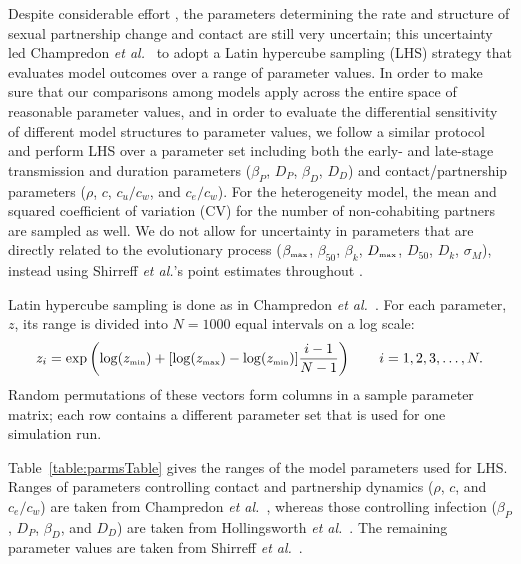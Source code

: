 \documentclass[10pt,letterpaper]{article}
\newcommand{\etal}{\textit{et al.}}
\newcommand{\tsub}[2]{#1_{{\textrm{\tiny #2}}}}
\begin{document}
Despite considerable effort \cite{hollingsworth_hiv1_2008,champredon_hiv_2013}, the parameters determining the rate and structure of sexual partnership change and contact are still very uncertain; this uncertainty led Champredon \etal\ \cite{champredon_hiv_2013} to adopt a Latin hypercube sampling (LHS) strategy \cite{blower_drugs_1991} that evaluates model outcomes over a range of parameter values. In order to make sure that our comparisons among models apply across the entire space of reasonable parameter values, and in order to evaluate the differential sensitivity of different model structures to parameter values, we follow a similar protocol and perform LHS over a parameter set including both the early- and late-stage transmission and duration parameters ($\beta_P$, $D_P$, $\beta_D$, $D_D$) and contact/partnership parameters ($\rho$, $c$, $c_u/c_w$, and $c_e/c_w$). For the heterogeneity model, the mean and squared coefficient of variation (CV) for the number of non-cohabiting partners are sampled as well. We do not allow for uncertainty in parameters that are directly related to the evolutionary process ($\tsub{\beta}{max}$, $\beta_{50}$, $\beta_k$, $\tsub{D}{max}$, $D_{50}$, $D_k$, $\sigma_M$), instead using Shirreff \etal's point estimates throughout \cite{shirreff_transmission_2011}.

Latin hypercube sampling is done as in Champredon \etal\ \cite{champredon_hiv_2013}. For each parameter, $z$, its range is divided into $N = 1000$ equal intervals on a log scale:
\begin{equation}
z_i = \exp\left(\log(\tsub{z}{min}) + [\log(\tsub{z}{max}) - \log(\tsub{z}{min})] \frac{i-1}{N-1}\right) \qquad i = 1, 2, 3, \dots,N.
\end{equation}
Random permutations of these vectors form columns in a sample parameter matrix; each row contains a different parameter set that is used for one simulation run.

Table~\ref{table:parmsTable} gives the ranges of the model parameters used for LHS. Ranges of parameters controlling contact and partnership dynamics ($\rho$, $c$, and $c_e/c_w$) are taken from Champredon \etal\ \cite{champredon_hiv_2013}, whereas those controlling infection ($\beta_P$, $D_P$, $\beta_D$, and $D_D$) are taken from Hollingsworth \etal\ \cite{hollingsworth_hiv1_2008}. The remaining parameter values are taken from Shirreff \etal\ \cite{shirreff_transmission_2011}.
\end{document}
